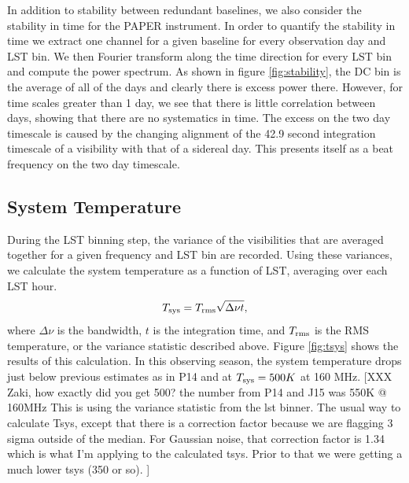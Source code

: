 \documentclass[twocolumn,numberedappendix]{emulateapj} \shorttitle{PSA64}
\newcommand{\Tsys}{T_{\rm sys}}
\begin{document}
In addition to stability between redundant baselines, we also consider the
stability in time for the PAPER instrument. In order to quantify the stability
in time we extract one channel for a given baseline for every observation day
and LST bin. We then Fourier transform along the time direction for every LST
bin and compute the power spectrum. As shown in figure \ref{fig:stability}, the
DC bin is the average of all of the days and clearly there is excess power
there. However, for time scales greater than 1 day, we see that there is little
correlation between days, showing that there are no systematics in time. The
excess on the two day timescale is caused by the changing alignment of the 42.9
second integration timescale of a visibility with that of a sidereal day. This
presents itself as a beat frequency on the two day timescale.

\subsection{System Temperature}   
During the LST binning step, the variance of the visibilities that are averaged
together for a given frequency and LST bin are recorded. Using these variances,
we calculate the system temperature as a function of LST, averaging over each
LST hour. 
\begin{equation}
    \Tsys = T_{\rm rms}\sqrt{\Delta\nu t}, 
\end{equation}
where $\Delta\nu$ is the bandwidth, $t$ is the integration time, and
$T_{\rm rms}$ is the RMS temperature, or the variance statistic described above.
Figure \ref{fig:tsys} shows the results of this calculation. In this observing
season, the system temperature drops just below previous estimates 
as in P14 and \citet{jacobs_et_al2014} at $\Tsys=500K$ at 160 MHz.
[XXX Zaki, how exactly did you get 500?  the number from P14 and J15 was 550K @ 160MHz
 This is using the variance statistic from the lst binner. The usual way to
calculate Tsys, except that there is a correction factor because we are flagging
3 sigma outside of the median. For Gaussian noise, that correction factor is
1.34 which is what I'm applying to the calculated tsys. Prior to that we were
getting a much lower tsys (350 or so). ]
\end{document}
